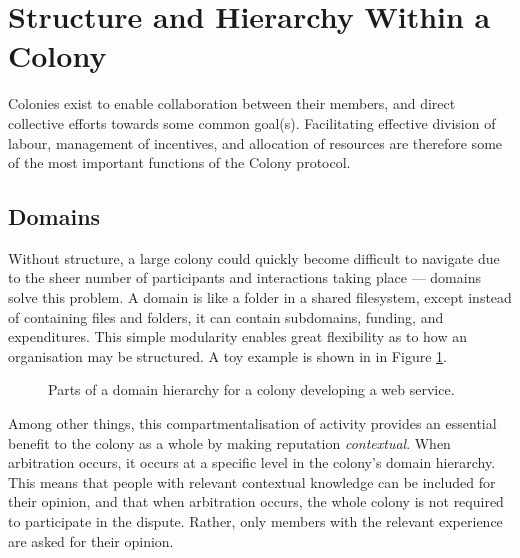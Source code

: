 \section{Structure and Hierarchy Within a Colony}\label{sec:colony-structure}
Colonies exist to enable collaboration between their members, and direct collective efforts towards some common goal(s). Facilitating effective division of labour, management of incentives, and allocation of resources are therefore some of the most important functions of the Colony protocol.

\subsection{Domains}\label{sec:domains}

Without structure, a large colony could quickly become difficult to navigate due to the sheer number of participants and interactions taking place --- domains solve this problem. A domain is like a folder in a shared filesystem, except instead of containing files and folders, it can contain subdomains, funding, and expenditures. This simple modularity enables great flexibility as to how an organisation may be structured. A toy example is shown in in Figure \ref{fig:domainhierarchysample}.

\begin{figure}[h]
    \centering
 \caption{Parts of a domain hierarchy for a colony developing a web service.}
 \label{fig:domainhierarchysample}

\end{figure}

Among other things, this compartmentalisation of activity provides an essential benefit to the colony as a whole by making reputation \textit{contextual}. When arbitration occurs, it occurs at a specific level in the colony's domain hierarchy. This means that people with relevant contextual knowledge can be included for their opinion, and that when arbitration occurs, the whole colony is not required to participate in the dispute. Rather, only members with the relevant experience are asked for their opinion.

